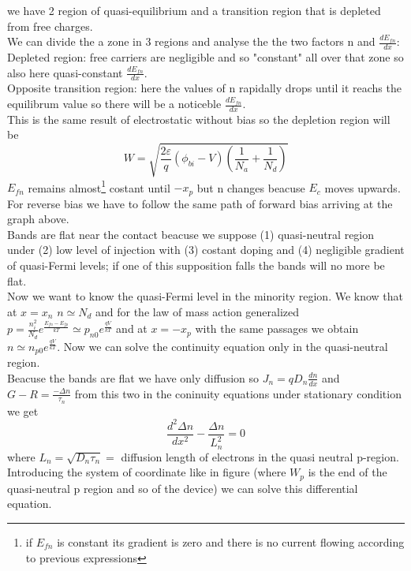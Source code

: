 we have 2 region of quasi-equilibrium and a transition region that is depleted from free charges.\\
\vspace{3mm}
We can divide the a zone in 3 regions and analyse the the two factors n and $\frac{dE_{fn}}{dx}$:\\ 
\tab Depleted region: free carriers are negligible and so "constant" all over that zone so also here quasi-constant $\frac{dE_{fn}}{dx}$.\\
\tab Opposite transition region: here the values of n rapidally drops until it reachs the equilibrum value so there will be a noticeble $\frac{dE_{fn}}{dx}$.\\
\vspace{3mm}  
This is the same result of electrostatic without bias so the depletion region will be
\begin{equation}
W=\sqrt{\frac{2\varepsilon}{q}(\phi_{bi}-V)(\frac{1}{N_a}+\frac{1}{N_d})}
\end{equation}
$E_{fn}$ remains almost\footnote{if $E_{fn}$ is constant its gradient is zero and there is no current flowing according to previous expressions} costant until $-x_p$ but n changes beacuse $E_c$ moves upwards.\\
For reverse bias we have to follow the same path of forward bias arriving at the graph above.\\
Bands are flat near the contact beacuse we suppose (1) quasi-neutral region under (2) low level of injection with (3) costant doping and (4) negligible gradient of quasi-Fermi levels; if one of this supposition falls the bands will no more be flat.\\
\vspace{5mm}
\label{cont.eq}
Now we want to know the quasi-Fermi level in the minority region.
We know that at $x=x_n$ $n\simeq N_d$ and for the law of mass action generalized $p=\frac{n_i^2}{N_d}e^{\frac{E_{fn}-E_{fp}}{kT}}\simeq p_{n0}e^{\frac{qV}{kT}}$ and at $x=-x_p$ with the same passages we obtain $n\simeq n_{p0}e^{\frac{qV}{kT}}$. Now we can solve the continuity equation only in the quasi-neutral region. \\
Beacuse the bands are flat we have only diffusion so $J_n=qD_n \frac{dn}{dx}$ and $G-R=\frac{-\Delta n}{\tau_n}$ from this two in the coninuity equations under stationary condition we get
\begin{equation}
\frac{d^2\Delta n}{dx^2}-\frac{\Delta n}{L_n^2}=0
\end{equation} 
where $L_n=\sqrt{D_n\tau_n}=$ diffusion length of electrons in the quasi neutral p-region. Introducing the system of coordinate like in figure (where $W_p$ is the end of the quasi-neutral p region and so of the device) we can solve this differential equation.

